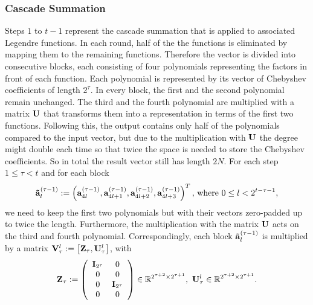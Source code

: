 \subsubsection{Cascade Summation}

Steps $1$ to $t-1$ represent the cascade summation that is applied to associated Legendre functions. In each round, half of the the functions is eliminated by mapping them to the remaining functions. Therefore the vector is divided into consecutive blocks, each consisting of four polynomials representing the factors in front of each function. Each polynomial is represented by its vector of Chebyshev coefficients of length $2^{\tau}$. In every block, the first and the second polynomial remain unchanged. The third and the fourth polynomial are multiplied with a matrix $\mathbf{U}$ that transforms them into a representation in terms of the first two functions. Following this, the output contains only half of the polynomials compared to the input vector, but due to the multiplication with $\mathbf{U}$ the degree might double each time so that twice the space is needed to store the Chebyshev coefficients. So in total the result vector still has length $2N$. For each step $1 \le \tau < t$ and for each block $$\mathbf{\tilde{a}}_{l}^{(\tau-1)} := \left(\mathbf{a}_{4l}^{(\tau-1)},\mathbf{a}_{4l+1}^{(\tau-1)},\mathbf{a}_{4l+2}^{(\tau-1)},\mathbf{a}_{4l+3}^{(\tau-1)}\right)^T \text{, where } 0 \le l < 2^{t-\tau-1},$$ we need to keep the first two polynomials but with their vectors zero-padded up to twice the length. Furthermore, the multiplication with the matrix $\mathbf{U}$ acts on the third and fourth polynomial.
Correspondingly, each block $\mathbf{\tilde{a}}_{l}^{(\tau-1)}$ is multiplied by a matrix $\mathbf{V}_{\tau}^l := \left[\mathbf{Z_{\tau}},\mathbf{U}_{\tau}^l\right]$, with
$$\mb{Z}_{\tau} := \left(\begin{array}{cccc} \mb{I}_{2^{\tau}} & 0\\ 0 & 0 \\ 0 & \mb{I}_{2^{\tau}} \\ 0 & 0 \end{array}\right) \in \R^{2^{\tau+2} \times 2^{\tau+1}},\ \mb{U}_{\tau}^l \in \R^{2^{\tau+2} \times 2^{\tau+1}}.$$
